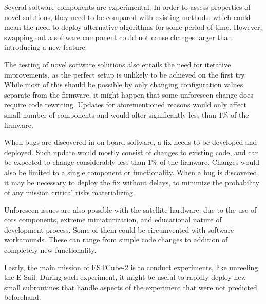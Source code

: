 Several software components are experimental. In order to assess properties of novel solutions, they need to be compared with existing methods, which could mean the need to deploy alternative algorithms for some period of time. However, swapping out a software component could not cause changes larger than introducing a new feature.

The testing of novel software solutions also entails the need for iterative improvements, as the perfect setup is unlikely to be achieved on the first try. While most of this should be possible by only changing configuration values separate from the firmware, it might happen that some unforeseen change does require code rewriting. Updates for aforementioned reasons would only affect small number of components and would alter significantly less than $1\%$ of the firmware.

When bugs are discovered in on-board software, a fix needs to be developed and deployed. Such update would mostly consist of changes to existing code, and can be expected to change considerably less than $1\%$ of the firmware. Changes would also be limited to a single component or functionality. When a bug is discovered, it may be necessary to deploy the fix without delays, to minimize the probability of any mission critical risks materializing.

Unforeseen issues are also possible with the satellite hardware, due to the use of \gls{cots} components, extreme miniaturization, and educational nature of development process. Some of them could be circumvented with software workarounds. These can range from simple code changes to addition of completely new functionality.

Lastly, the main mission of ESTCube-2 is to conduct experiments, like unreeling the E-Sail. During such experiment, it might be useful to rapidly deploy new small subroutines that handle aspects of the experiment that were not predicted beforehand.